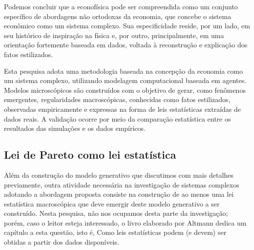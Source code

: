 Podemos concluir que a econofísica pode ser compreendida como um conjunto específico de abordagens não ortodoxas da economia, que concebe o sistema econômico como um sistema complexo. Sua especificidade reside, por um lado, em seu histórico de inspiração na física e, por outro, principalmente, em uma orientação fortemente baseada em dados, voltada à reconstrução e explicação dos fatos estilizados.



Esta pesquisa adota uma metodologia baseada na concepção da economia como um sistema complexo, utilizando modelagem computacional baseada em agentes. Modelos microscópicos são construídos com o objetivo de gerar, como fenômenos emergentes, regularidades macroscópicas, conhecidas como fatos estilizados, observadas empiricamente e expressas na forma de leis estatísticas extraídas de dados reais. A validação ocorre por meio da comparação estatística entre os resultados das simulações e os dados empíricos.

%
\subsection{Lei de Pareto como lei estatística}
Além da construção do modelo generativo que discutimos com mais detalhes previamente, outra atividade necessária na investigação de sistemas complexos adotando a abordagem proposta consiste na construção de ao menos uma lei estatística macroscópica que deve emergir deste modelo generativo a ser construído. Nesta pesquisa, não nos ocupamos desta parte da investigação; porém, caso o leitor esteja interessado, o livro elaborado por Altmann dedica um capítulo a esta questão, isto é, Como leis estatísticas podem (e devem) ser obtidas a partir dos dados disponíveis\cite{Altmann_2024}.


